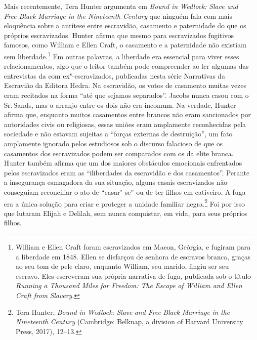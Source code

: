 Mais recentemente, Tera Hunter argumenta em \emph{Bound in Wedlock:
Slave and Free Black Marriage in the Nineteenth Century} que ninguém
fala com mais eloquência sobre a antítese entre escravidão, casamento e
paternidade do que os próprios escravizados. Hunter afirma que mesmo
para escravizados fugitivos famosos, como William e Ellen Craft, o casamento
e a paternidade não existiam sem liberdade.\footnote{William e Ellen Craft foram escravizados em Macon, Geórgia, e fugiram
  para a liberdade em 1848. Ellen se disfarçou de senhora de escravos
  branca, graças ao seu tom de pele claro, enquanto William, seu marido,
  fingiu ser seu escravo. Eles escreveram sua própria narrativa de fuga,
  publicada sob o título \emph{Running a Thousand Miles for Freedom: The
  Escape of William and Ellen Craft from Slavery.}} Em outras palavras,
a liberdade era essencial para viver esses relacionamentos, algo que o
leitor também pode compreender ao ler algumas das entrevistas da  com
ex"-escravizados, publicadas nesta série Narrativas da Escravião da Editora
Hedra. Na escravidão, os votos de casamento muitas vezes eram recitados
na forma ``até que sejamos separados''. Jacobs nunca casou com o Sr.\,Sands, mas o arranjo entre os dois não era incomum. Na verdade, Hunter
afirma que, enquanto muitos casamentos entre brancos não eram
sancionados por autoridades civis ou religiosas, essas uniões eram
amplamente reconhecidas pela sociedade e não estavam sujeitas a ``forças
externas de destruição'', um fato amplamente ignorado pelos estudiosos
sob o discurso falacioso de que os casamentos dos escravizados podem
ser comparados com os da elite branca. Hunter também
afirma que um dos maiores obstáculos emocionais enfrentados pelos
escravizados eram as ``iliberdades da escravidão e dos casamentos''.
Perante a insegurança esmagadora da sua situação, alguns casais
escravizados não conseguiam reconciliar o ato de ``casar"-se'' ou de ter
filhos em cativeiro. A fuga era a única solução para criar e proteger a
unidade familiar negra.\footnote{Tera Hunter, \emph{Bound in Wedlock:
  Slave and Free Black Marriage in the Nineteenth Century} (Cambridge:
  Belknap, a division of Harvard University Press, 2017), 12--13.}%
  Foi por isso que lutaram Elijah e Delilah, sem nunca
conquistar, em vida, para seus próprios filhos.

